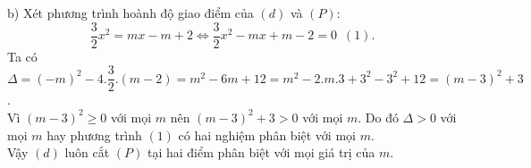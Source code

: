 \begin{ex}
{{}
{\par b) Xét phương trình hoành độ giao điểm của $(d)$ và $(P)$: $$\dfrac{3}{2}x^2=mx-m+2 \Leftrightarrow \dfrac{3}{2}x^2-mx+m-2=0 \hspace{6pt} (1).$$
Ta có $\Delta=(-m)^2-4.\dfrac{3}{2}.(m-2)=m^2-6m+12=m^2-2.m.3+3^2-3^2+12=(m-3)^2+3$.\\
Vì $(m-3)^2 \ge 0$ với mọi $m$ nên $(m-3)^2+3>0$ với mọi $m$. Do đó $\Delta>0$ với mọi $m$ hay phương trình $(1)$ có hai nghiệm phân biệt với mọi $m$.\\
Vậy $(d)$ luôn cắt $(P)$ tại hai điểm phân biệt với mọi giá trị của $m$.}}
\end{ex}

